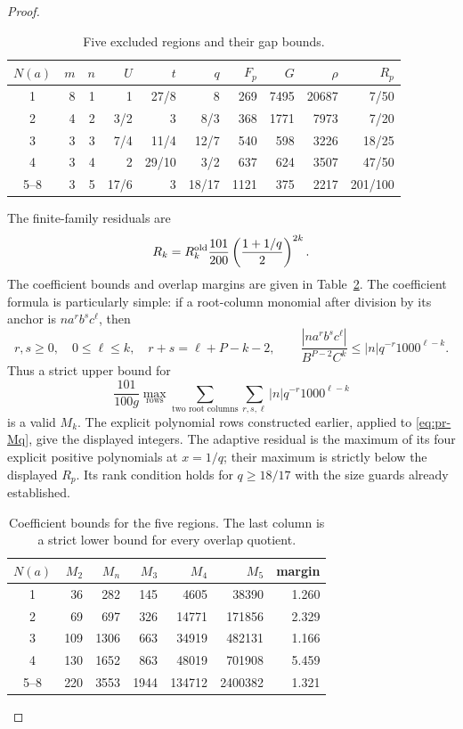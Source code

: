 \documentclass[12pt]{article}
\numberwithin{equation}{section}
\begin{document}
\begin{proof}
\begin{table}[htbp]
\centering\small
\caption{Five excluded regions and their gap bounds.}
\label{tab:pr-five-regions}
\begin{tabular}{c|rrrrrrrrr}
\(N(a)\)&\(m\)&\(n\)&\(U\)&\(t\)&\(q\)&\(F_p\)&\(G\)&\(\rho\)&\(R_p\)\\\hline
1&8&1&1&27/8&8&269&7495&20687&7/50\\
2&4&2&3/2&3&8/3&368&1771&7973&7/20\\
3&3&3&7/4&11/4&12/7&540&598&3226&18/25\\
4&3&4&2&29/10&3/2&637&624&3507&47/50\\
5--8&3&5&17/6&3&18/17&1121&375&2217&201/100
\end{tabular}
\end{table}
The finite-family residuals are
\begin{equation}\label{eq:pr-ratio-residual}
 R_k=R_k^{\rm old}\frac{101}{200}
             \left(\frac{1+1/q}{2}\right)^{2k}.
\end{equation}
The coefficient bounds and overlap margins are given in
Table~\ref{tab:pr-five-coefficients}. The coefficient formula is
particularly simple: if a root-column monomial after division by its
anchor is \(n a^r b^s c^\ell\), then
\[
 r,s\ge0,\quad0\le\ell\le k,\quad r+s=\ell+P-k-2,
 \qquad
 \frac{|n a^r b^s c^\ell|}{B^{P-2}C^k}
 \le |n|q^{-r}1000^{\ell-k}.
\]
Thus a strict upper bound for
\begin{equation}\label{eq:pr-Mq}
 \frac{101}{100g}\max_{\text{rows}}
       \sum_{\text{two root columns}}\sum_{r,s,\ell}
                    |n|q^{-r}1000^{\ell-k}
\end{equation}
is a valid \(M_k\). The explicit polynomial rows constructed earlier,
applied to \eqref{eq:pr-Mq}, give the displayed integers.
The adaptive residual is the maximum of its four explicit positive
polynomials at \(x=1/q\); their maximum is strictly below the displayed
\(R_p\). Its rank condition holds for \(q\ge18/17\) with the size
guards already established.
\begin{table}[htbp]
\centering\small
\caption{Coefficient bounds for the five regions. The last column is a
strict lower bound for every overlap quotient.}
\label{tab:pr-five-coefficients}
\begin{tabular}{c|rrrrrr}
\(N(a)\)&\(M_2\)&\(M_n\)&\(M_3\)&\(M_4\)&\(M_5\)&margin\\\hline
1&36&282&145&4605&38390&1.260\\
2&69&697&326&14771&171856&2.329\\
3&109&1306&663&34919&482131&1.166\\
4&130&1652&863&48019&701908&5.459\\
5--8&220&3553&1944&134712&2400382&1.321
\end{tabular}
\end{table}


\end{proof}
\end{document}
